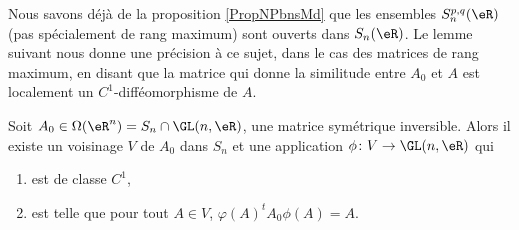 Nous savons déjà de la proposition \ref{PropNPbnsMd} que les ensembles \( S_n^{p,q}(\eR)\) (pas spécialement de rang maximum) sont ouverts dans \( S_n(\eR)\). Le lemme suivant nous donne une précision à ce sujet, dans le cas des matrices de rang maximum, en disant que la matrice qui donne la similitude entre \( A_0\) et \( A\) est localement un \( C^1\)-difféomorphisme de \( A\).
\begin{lemma}   \label{LemWLCvLXe}
    Soit \( A_0\in \Omega(\eR^n)= S_n\cap\GL(n,\eR)\), une matrice symétrique inversible. Alors il existe un voisinage \( V\) de \( A_0\) dans \( S_n\) et une application \( \phi\colon V\to \GL(n,\eR)\) qui
    \begin{enumerate}
        \item
            est de classe \( C^1\),
        \item
            est telle que pour tout \( A\in V\), \( \varphi(A)^t A_0\phi(A)=A\).
    \end{enumerate}
\end{lemma}

